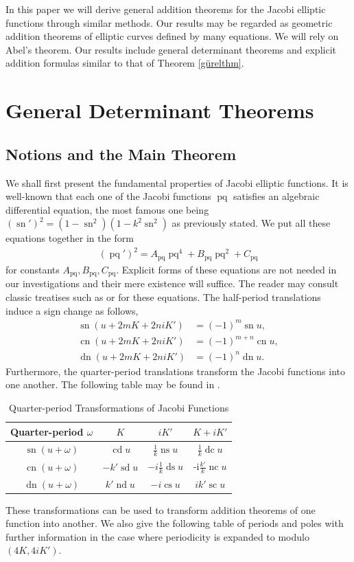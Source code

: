 \documentclass{amsart}
\theoremstyle{definition}
\DeclareMathOperator{\ns}{ns}
\DeclareMathOperator{\nc}{nc}
\DeclareMathOperator{\dn}{dn}
\DeclareMathOperator{\ds}{ds}
\DeclareMathOperator{\cs}{cs}
\DeclareMathOperator{\sn}{sn}
\DeclareMathOperator{\cn}{cn}
\DeclareMathOperator{\nd}{nd}
\DeclareMathOperator{\scJ}{sc}
\DeclareMathOperator{\cd}{cd}
\DeclareMathOperator{\dc}{dc}
\DeclareMathOperator{\sd}{sd}
\DeclareMathOperator{\pq}{pq}
\begin{document}
In this paper we will derive general addition theorems for the Jacobi elliptic functions through similar methods. Our results may be regarded as geometric addition theorems of elliptic curves defined by many equations. We will rely on Abel's theorem. Our results include general determinant theorems and explicit addition formulas similar to that of Theorem \ref{gürelthm}.


\section{General Determinant Theorems}
\subsection{Notions and the Main Theorem}

We shall first present the fundamental properties of Jacobi elliptic functions. It is well-known that each one of the Jacobi functions $\pq$ satisfies an algebraic differential equation, the most famous one being $\left(\sn'\right)^2=\left(1-\sn^2\right)\left(1-k^2\sn^2\right)$ as previously stated. We put all these equations together in the form
\begin{align*}
    \left(\pq'\right)^2=A_{\pq}\pq^4+B_{\pq}\pq^2+C_{\pq}
\end{align*}
for constants $A_{\pq},B_{\pq},C_{\pq}$. Explicit forms of these equations are not needed in our investigations and their mere existence will suffice. The reader may consult classic treatises such as \cite{Whittakter} or \cite{dlmf} for these equations. The half-period translations induce a sign change as follows,
\begin{align*}
    \sn(u+2mK+2niK')&=(-1)^{m}\sn u,\\
    \cn(u+2mK+2niK')&=(-1)^{m+n}\cn u,\\
    \dn(u+2mK+2niK')&=(-1)^{n}\dn u.
\end{align*}
Furthermore, the quarter-period translations transform the Jacobi functions into one another. The following table may be found in \cite{dlmf}.
\begin{center}
\begin{table}[h]
    \begin{tabular}{|c|c|c|c|}
    \hline
    Quarter-period $\omega$ & $K$ & $iK'$ & $K+iK'$\\ \hline
    $\sn(u+\omega)$ & $\cd u$ & $\frac{1}{k}\ns u$ & $\frac{1}{k}\dc u$ \\ \hline
    $\cn(u+\omega)$ & $-k' \sd u$ & $-i\frac{1}{k}\ds u$ & -i$\frac{k'}{k}\nc u$ \\ \hline      
    $\dn(u+\omega)$ & $k'\nd  u$ & $-i\cs u$ & $i k'\scJ u$ \\ \hline      
    \end{tabular}\medskip
    
    \caption{Quarter-period Transformations of Jacobi Functions}
\end{table}
\end{center}
These transformations can be used to transform addition theorems of one function into another. We also give the following table of periods and poles with further information in the case where periodicity is expanded to modulo $(4K,4iK')$.
\end{document}
